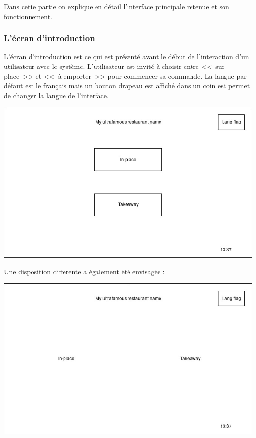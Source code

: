 \documentclass[a4paper,12pt]{article}
\begin{document}
Dans cette partie on explique en détail l'interface principale retenue et son fonctionnement.

\subsubsection{L'écran d'introduction}

L'écran d'introduction est ce qui est présenté avant le début de l'interaction d'un utilisateur avec le système.
L'utilisateur est invité à choisir entre <<~sur place~>> et <<~à emporter~>> pour commencer sa commande. La langue par
défaut est le français mais un bouton drapeau est affiché dans un coin est permet de changer la langue de l'interface.

\begin{center}
	\includegraphics[width=\textwidth]{intro_screen.jpg}
\end{center}

Une disposition différente a également été envisagée :

\begin{center}
	\includegraphics[width=\textwidth]{alt_intro_screen.jpg}
\end{center}
\end{document}
